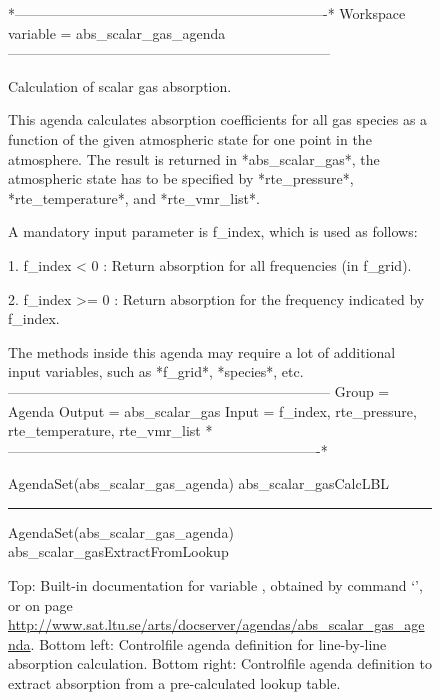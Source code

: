 \begin{figure}
\begin{code}
*-------------------------------------------------------------------*
Workspace variable = abs_scalar_gas_agenda
---------------------------------------------------------------------

Calculation of scalar gas absorption.

This agenda calculates absorption coefficients for all gas species 
as a function of the given atmospheric state for one point in the 
atmosphere. The result is returned in *abs_scalar_gas*, the 
atmospheric state has to be specified by *rte_pressure*, 
*rte_temperature*, and *rte_vmr_list*.

A mandatory input parameter is f_index, which is used as follows:

1. f_index < 0 : Return absorption for all frequencies (in f_grid).

2. f_index >= 0 : Return absorption for the frequency indicated by
   f_index. 

The methods inside this agenda may require a lot of additional
input variables, such as *f_grid*, *species*, etc.
---------------------------------------------------------------------
Group  = Agenda
Output = abs_scalar_gas
Input  = f_index, rte_pressure, rte_temperature, rte_vmr_list
*-------------------------------------------------------------------*
\end{code}
\begin{minipage}[t]{0.48\hsize}
\begin{code}
AgendaSet(abs_scalar_gas_agenda)
{
  abs_scalar_gasCalcLBL
}
\end{code}
\end{minipage}
\hspace*{\fill}
\rule[-40pt]{.5pt}{50pt}
\hspace*{\fill}
\begin{minipage}[t]{0.48\hsize}
\begin{code}
AgendaSet(abs_scalar_gas_agenda)
{
  abs_scalar_gasExtractFromLookup
}
\end{code}
\end{minipage}
\caption{Top: Built-in documentation for variable
  , obtained by command
  `', or on page
  \url{http://www.sat.ltu.se/arts/docserver/agendas/abs_scalar_gas_agenda}. Bottom
  left: Controlfile agenda definition for line-by-line absorption
  calculation. Bottom right: Controlfile agenda definition to extract
  absorption from a pre-calculated lookup table.}
\label{fig:agendas}
\end{figure}

